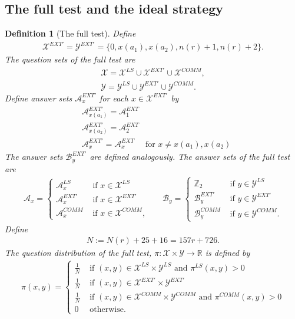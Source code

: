 \documentclass[11pt,letterpaper]{article}
\newcommand{\R}{\mathbb{R}}
\newcommand{\Z}{\mathbb{Z}}
\newcommand{\calX}{\mathcal{X}}
\newcommand{\calY}{\mathcal{Y}}
\newcommand{\calA}{\mathcal{A}}
\newcommand{\calB}{\mathcal{B}}
\newcommand{\1}{\mathbb{1}}
\newcommand{\EXT}{EXT}
\newcommand{\LS}{LS}
\newcommand{\COMM}{COMM}
\newcommand{\nr}{n(r)}
\newtheorem{definition}[theorem]{Definition}
\theoremstyle{definition}
\begin{document}
\subsection{The full test and the ideal strategy}
\label{sec:ideal_strat}
\begin{definition}[The full test]
\label{def:full_test}
Define 
\begin{align*}
    \calX^{\EXT'} = \calY^{\EXT'} = \{0, x(a_1), x(a_2), \nr+1, \nr+2\}.
\end{align*}
The question sets of the full test are
\begin{align*}
    \calX = \calX^{\LS} \cup \calX^{\EXT'} \cup \calX^{\COMM}, \\
    \calY = \calY^{\LS} \cup \calY^{\EXT'} \cup \calY^{\COMM}.
\end{align*}
Define answer sets $\calA_x^{\EXT'}$ for each $x \in \calX^{\EXT'}$
by 
\begin{align*}
    &\calA_{x(a_1)}^{\EXT'} =\calA_{1}^{\EXT} \\
    &\calA_{x(a_2)}^{\EXT'} =\calA_{2}^{\EXT} \\
    &\calA_{x}^{\EXT'} = \calA_{x}^{\EXT} 
    \quad \text{ for } x \neq x(a_1), x(a_2)
\end{align*}
The answer sets $\calB_y^{\EXT'}$ are defined analogously.
The answer sets of the full test are
\begin{align*}
    \calA_x = 
    \begin{cases}
    \calA_x^{\LS} &\text{ if } x \in \calX^{\LS} \\
    \calA_x^{\EXT'} &\text{ if } x \in \calX^{\EXT'} \\
    \calA_x^{\COMM} & \text{ if } x \in \calX^{\COMM},
    \end{cases}
    &&
    \calB_y = 
    \begin{cases}
    \Z_2 &\text{ if } y \in \calY^{\LS} \\
    \calB_y^{\EXT'} &\text{ if } y \in \calY^{\EXT'} \\
    \calB_y^{\COMM} & \text{ if } y \in \calY^{\COMM}.
    \end{cases}
\end{align*}
Define 
\begin{align*}
    N :=  N(r) + 25 + 16 = 157r + 726.
\end{align*}
The question distribution of the full test, $\pi: \calX \times \calY \rightarrow \R$ is defined by
\begin{align*}
    \pi(x,y) = \begin{cases}
    \frac{1}{N} & \text{ if } (x,y) \in \calX^{\LS} \times \calY^{\LS} 
    \text{ and } \pi^{\LS}(x,y) > 0 \\
    \frac{1}{N} & \text{ if } (x,y) \in \calX^{\EXT'} \times \calY^{\EXT'}\\
    \frac{1}{N} & \text{ if } (x,y) \in \calX^{\COMM} \times \calY^{\COMM} 
    \text{ and } \pi^{\COMM}(x,y) > 0 \\
    0 & \text{ otherwise}.
    \end{cases}
\end{align*}
\end{definition}
\end{document}
